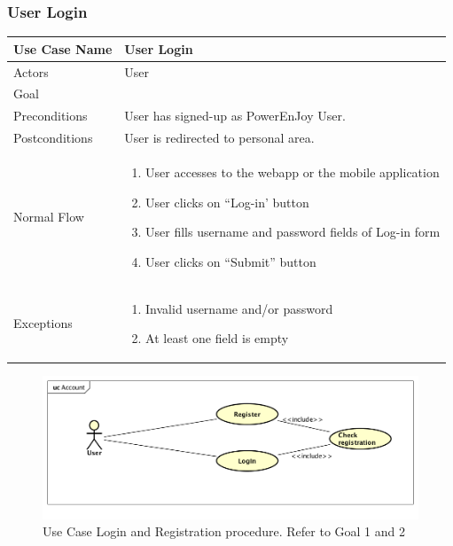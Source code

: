\subsubsection{User Login}
\begin{center}
	\begin{tabular}{|l|>{\raggedright}p{10cm}|}
		\hline 
		Use Case Name & User Login\tabularnewline
		\hline 
		\hline 
		Actors & User\tabularnewline
		\hline 
		Goal & \goal{2}\tabularnewline
		\hline 
		Preconditions & User has signed-up as PowerEnJoy User.\tabularnewline
		\hline 
		Postconditions & User is redirected to personal area.\tabularnewline
		\hline 
		Normal Flow & \begin{enumerate}
			\item User accesses to the webapp or the mobile application
			\item User clicks on ``Log-in' button
			\item User fills username and password fields of Log-in form
			\item User clicks on ``Submit'' button
			\end{enumerate}
		\tabularnewline
		\hline 
		Exceptions & \begin{enumerate}
		\item Invalid username and/or password
		\item At least one field is empty\end{enumerate}
		\tabularnewline
		\hline 
	\end{tabular}
	\par\end{center}

\begin{figure}[h]
	\centering
	\includegraphics[scale=0.5]{img/usecase_login_registration}
	\caption{Use Case Login and Registration procedure. Refer to Goal 1 and 2}
\end{figure}
\FloatBarrier

